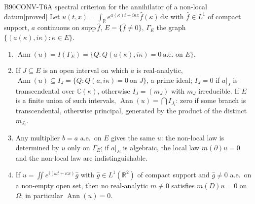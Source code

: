 \documentclass[11pt,a4paper,oneside]{report}
\newcommand{\badge}[2]{\textcolor{#1}{\textsf{\footnotesize[#2]}}}
\newcommand{\proved}{\badge{cC}{proved}}
\newcommand{\R}{\mathbb{R}}\newcommand{\C}{\mathbb{C}}\newcommand{\N}{\mathbb{N}}\newcommand{\Z}{\mathbb{Z}}\newcommand{\Q}{\mathbb{Q}}
\newcommand{\Ann}{\operatorname{Ann}}
\newcommand{\dd}{\,\mathrm{d}}
\newenvironment{dimcard}[5]{\par\Needspace{12\baselineskip}\begin{dimcardbox}{#1}{#2}{#3}{#4}{#5}}{\end{dimcardbox}}
\begin{document}
\begin{dimcard}{B90}{CONV-T6}{A spectral criterion for the annihilator of a non-local datum}{\proved}{}
Let $u(t,x)=\int_\R e^{a(\kappa)t+i\kappa x}\hat f(\kappa)\dd\kappa$ with $\hat f\in L^1$ of compact support, $a$ continuous on $\mathrm{supp}\,\hat f$, $E=\{\hat f\ne0\}$, $\Gamma_E$ the graph $\{(a(\kappa),i\kappa):\kappa\in E\}$.
\begin{enumerate}[label=(\arabic*)]
\item $\Ann(u)=I(\Gamma_E)=\{Q:Q(a(\kappa),i\kappa)=0\ \text{a.e. on }E\}$.
\item If $J\subseteq E$ is an open interval on which $a$ is real-analytic, $\Ann(u)\subseteq I_J=\{Q:Q(a,i\kappa)=0\ \text{on }J\}$, a prime ideal; $I_J=0$ if $a|_J$ is transcendental over $\C(\kappa)$, otherwise $I_J=(m_J)$ with $m_J$ irreducible. If $E$ is a finite union of such intervals, $\Ann(u)=\bigcap I_{J_i}$: zero if some branch is transcendental, otherwise principal, generated by the product of the distinct $m_{J_i}$.
\item Any multiplier $b=a$ a.e.\ on $E$ gives the same $u$: the non-local law is determined by $u$ only on $\Gamma_E$; if $a|_E$ is algebraic, the local law $m(\partial)u=0$ and the non-local law are indistinguishable.
\item If $u=\iint e^{i(\omega t+\kappa x)}\hat g$ with $\hat g\in L^1(\R^2)$ of compact support and $\hat g\ne0$ a.e.\ on a non-empty open set, then no real-analytic $m\not\equiv0$ satisfies $m(D)u=0$ on $\Omega$; in particular $\Ann(u)=0$.
\end{enumerate}
\end{dimcard}
\end{document}
